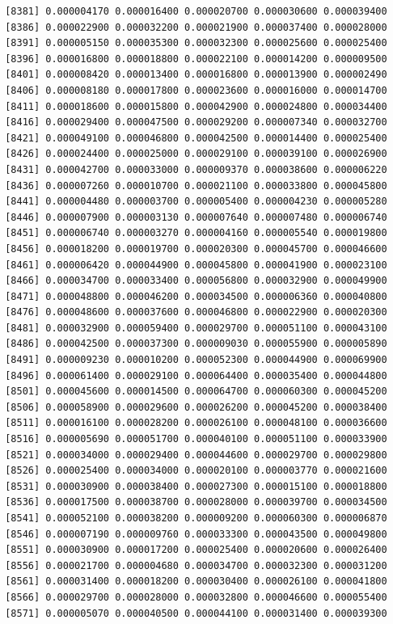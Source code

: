 \documentclass[]{article}
\begin{document}
\begin{verbatim}
 [8381] 0.000004170 0.000016400 0.000020700 0.000030600 0.000039400
 [8386] 0.000022900 0.000032200 0.000021900 0.000037400 0.000028000
 [8391] 0.000005150 0.000035300 0.000032300 0.000025600 0.000025400
 [8396] 0.000016800 0.000018800 0.000022100 0.000014200 0.000009500
 [8401] 0.000008420 0.000013400 0.000016800 0.000013900 0.000002490
 [8406] 0.000008180 0.000017800 0.000023600 0.000016000 0.000014700
 [8411] 0.000018600 0.000015800 0.000042900 0.000024800 0.000034400
 [8416] 0.000029400 0.000047500 0.000029200 0.000007340 0.000032700
 [8421] 0.000049100 0.000046800 0.000042500 0.000014400 0.000025400
 [8426] 0.000024400 0.000025000 0.000029100 0.000039100 0.000026900
 [8431] 0.000042700 0.000033000 0.000009370 0.000038600 0.000006220
 [8436] 0.000007260 0.000010700 0.000021100 0.000033800 0.000045800
 [8441] 0.000004480 0.000003700 0.000005400 0.000004230 0.000005280
 [8446] 0.000007900 0.000003130 0.000007640 0.000007480 0.000006740
 [8451] 0.000006740 0.000003270 0.000004160 0.000005540 0.000019800
 [8456] 0.000018200 0.000019700 0.000020300 0.000045700 0.000046600
 [8461] 0.000006420 0.000044900 0.000045800 0.000041900 0.000023100
 [8466] 0.000034700 0.000033400 0.000056800 0.000032900 0.000049900
 [8471] 0.000048800 0.000046200 0.000034500 0.000006360 0.000040800
 [8476] 0.000048600 0.000037600 0.000046800 0.000022900 0.000020300
 [8481] 0.000032900 0.000059400 0.000029700 0.000051100 0.000043100
 [8486] 0.000042500 0.000037300 0.000009030 0.000055900 0.000005890
 [8491] 0.000009230 0.000010200 0.000052300 0.000044900 0.000069900
 [8496] 0.000061400 0.000029100 0.000064400 0.000035400 0.000044800
 [8501] 0.000045600 0.000014500 0.000064700 0.000060300 0.000045200
 [8506] 0.000058900 0.000029600 0.000026200 0.000045200 0.000038400
 [8511] 0.000016100 0.000028200 0.000026100 0.000048100 0.000036600
 [8516] 0.000005690 0.000051700 0.000040100 0.000051100 0.000033900
 [8521] 0.000034000 0.000029400 0.000044600 0.000029700 0.000029800
 [8526] 0.000025400 0.000034000 0.000020100 0.000003770 0.000021600
 [8531] 0.000030900 0.000038400 0.000027300 0.000015100 0.000018800
 [8536] 0.000017500 0.000038700 0.000028000 0.000039700 0.000034500
 [8541] 0.000052100 0.000038200 0.000009200 0.000060300 0.000006870
 [8546] 0.000007190 0.000009760 0.000033300 0.000043500 0.000049800
 [8551] 0.000030900 0.000017200 0.000025400 0.000020600 0.000026400
 [8556] 0.000021700 0.000004680 0.000034700 0.000032300 0.000031200
 [8561] 0.000031400 0.000018200 0.000030400 0.000026100 0.000041800
 [8566] 0.000029700 0.000028000 0.000032800 0.000046600 0.000055400
 [8571] 0.000005070 0.000040500 0.000044100 0.000031400 0.000039300

\end{verbatim}
\end{document}
